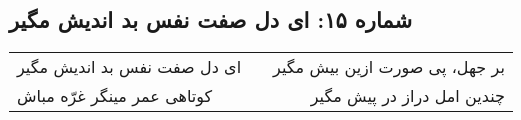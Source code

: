 \begin{center}
\section*{شماره ۱۵: ای دل صفت نفس بد اندیش مگیر}
\label{sec:015}
\begin{longtable}{l p{0.5cm} r}
ای دل صفت نفس بد اندیش مگیر
&&
بر جهل، پی صورت ازین بیش مگیر
\\
کوتاهی عمر مینگر غرّه مباش
&&
چندین امل دراز در پیش مگیر
\\
\end{longtable}
\end{center}
